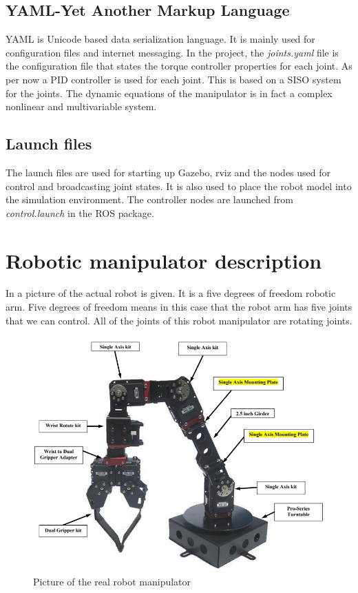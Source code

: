 \subsection{YAML-Yet Another Markup Language}
YAML is Unicode based data serialization language. It is mainly used for configuration files and internet messaging\cite{YAMLdoc}. In the project, the \textit{joints.yaml} file is the configuration file that states the torque controller properties for each joint. As per now a PID controller is used for each joint. This is based on a SISO system for the joints. The dynamic equations of the manipulator is in fact a complex nonlinear and multivariable system\cite{spong}.

\subsection{Launch files}
The launch files are used for starting up Gazebo, rviz and the nodes used for control and broadcasting joint states. It is also used to place the robot model into the simulation environment. The controller nodes are launched from \textit{control.launch} in the ROS package. 



























\section{Robotic manipulator description}
In  a picture of the actual robot is given. It is a five degrees of freedom robotic arm. Five degrees of freedom means in this case that the robot arm has five joints that we can control. All of the joints of this robot manipulator are rotating joints\cite{Crustcrawler}. 
\begin{figure}[htbp]
  \centering
  \includegraphics[width=.7\textwidth]{img/robotAH.png}
  \caption{Picture of the real robot manipulator}
  \label{fig:robotAH}
\end{figure}

